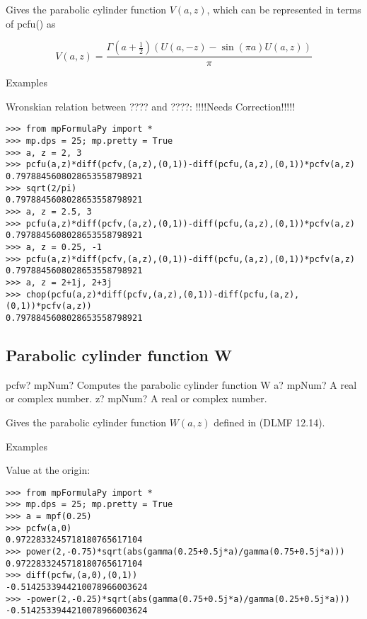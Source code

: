 \vpara
Gives the parabolic cylinder function $V(a, z)$, which can be represented in terms of pcfu() as

\begin{equation}
V(a, z) = \frac{\Gamma(a+\frac{1}{2}) (U(a, -z) - \sin(\pi a)U(a, z))}{\pi}
\end{equation}

Examples

Wronskian relation between ???? and ????: !!!!Needs Correction!!!!!

\begin{lstlisting}
>>> from mpFormulaPy import *
>>> mp.dps = 25; mp.pretty = True
>>> a, z = 2, 3
>>> pcfu(a,z)*diff(pcfv,(a,z),(0,1))-diff(pcfu,(a,z),(0,1))*pcfv(a,z)
0.7978845608028653558798921
>>> sqrt(2/pi)
0.7978845608028653558798921
>>> a, z = 2.5, 3
>>> pcfu(a,z)*diff(pcfv,(a,z),(0,1))-diff(pcfu,(a,z),(0,1))*pcfv(a,z)
0.7978845608028653558798921
>>> a, z = 0.25, -1
>>> pcfu(a,z)*diff(pcfv,(a,z),(0,1))-diff(pcfu,(a,z),(0,1))*pcfv(a,z)
0.7978845608028653558798921
>>> a, z = 2+1j, 2+3j
>>> chop(pcfu(a,z)*diff(pcfv,(a,z),(0,1))-diff(pcfu,(a,z),(0,1))*pcfv(a,z))
0.7978845608028653558798921
\end{lstlisting}



\subsection{Parabolic cylinder function W}

\begin{mpFunctionsExtract}
	\mpFunctionTwo
	{pcfw? mpNum? Computes the parabolic cylinder function W}
	{a? mpNum? A real or complex number.}
	{z? mpNum? A real or complex number.}	
\end{mpFunctionsExtract}


Gives the parabolic cylinder function $W(a, z)$ defined in (DLMF 12.14).

Examples

Value at the origin:

\begin{lstlisting}
>>> from mpFormulaPy import *
>>> mp.dps = 25; mp.pretty = True
>>> a = mpf(0.25)
>>> pcfw(a,0)
0.9722833245718180765617104
>>> power(2,-0.75)*sqrt(abs(gamma(0.25+0.5j*a)/gamma(0.75+0.5j*a)))
0.9722833245718180765617104
>>> diff(pcfw,(a,0),(0,1))
-0.5142533944210078966003624
>>> -power(2,-0.25)*sqrt(abs(gamma(0.75+0.5j*a)/gamma(0.25+0.5j*a)))
-0.5142533944210078966003624
\end{lstlisting}





